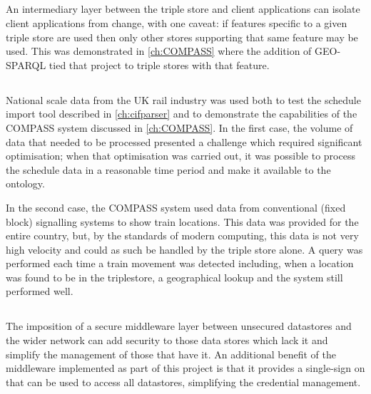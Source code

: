 \subsection{\QuestionChange}
An intermediary layer between the triple store and client applications can isolate client applications from change, with one caveat: if features specific to a given triple store are used then only other stores supporting that same feature may be used. This was demonstrated in \autoref{ch:COMPASS} where the addition of GEO-SPARQL tied that project to triple stores with that feature.

\subsection{\QuestionCanOntologyScale}
National scale data from the UK rail industry was used both to test the schedule import tool described in \autoref{ch:cifparser} and to demonstrate the capabilities of the COMPASS system discussed in \autoref{ch:COMPASS}. In the first case, the volume of data that needed to be processed presented a challenge which required significant optimisation; when that optimisation was carried out, it was possible to process the schedule data in a reasonable time period and make it available to the ontology. 

In the second case, the COMPASS system used data from conventional (fixed block) signalling systems to show train locations. This data was provided for the entire country, but, by the standards of modern computing, this data is not very high velocity and could as such be handled by the triple store alone. A query was performed each time a train movement was detected including, when a location was found to be in the triplestore, a geographical lookup and the system still performed well.

\subsection{\QuestionSecurity}
The imposition of a secure middleware layer between unsecured datastores and the wider network can add security to those data stores which lack it and simplify the management of those that have it. An additional benefit of the middleware implemented as part of this project is that it provides a single-sign on that can be used to access all datastores, simplifying the credential management.